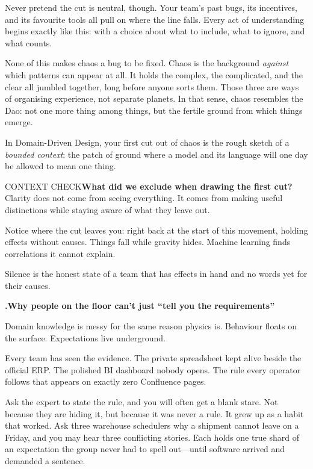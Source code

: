 \documentclass[10pt,a4paper]{article}
\newcounter{movement}
\newcounter{sub}[movement]
\renewcommand{\thesub}{\arabic{movement}.\arabic{sub}}
\newcommand{\Checkpoint}[2]{\begin{checkbox}{#1}#2\end{checkbox}}
\newcommand{\SubHead}[1]{%
  \par\Needspace{5\baselineskip}\stepcounter{sub}\vspace{2mm}%
  {\ttfamily\bfseries\footnotesize\textcolor{G2}{\thesub}\enspace\sffamily\bfseries\normalsize #1\par}%
  \vspace{0.6mm}%
}
\begin{document}
Never pretend the cut is neutral, though. Your team's past bugs, its incentives, and its favourite tools all pull on where the line falls. Every act of understanding begins exactly like this: with a choice about what to include, what to ignore, and what counts.

None of this makes chaos a bug to be fixed. Chaos is the background \emph{against} which patterns can appear at all. It holds the complex, the complicated, and the clear all jumbled together, long before anyone sorts them. Those three are ways of organising experience, not separate planets. In that sense, chaos resembles the Dao: not one more thing among things, but the fertile ground from which things emerge.

In Domain-Driven Design, your first cut out of chaos is the rough sketch of a \emph{bounded context}: the patch of ground where a model and its language will one day be allowed to mean one thing.

\Checkpoint{CONTEXT CHECK}{\textbf{What did we exclude when drawing the first cut?} Clarity does not come from seeing everything. It comes from making useful distinctions while staying aware of what they leave out.}

Notice where the cut leaves you: right back at the start of this movement, holding effects without causes. Things fall while gravity hides. Machine learning finds correlations it cannot explain.

Silence is the honest state of a team that has effects in hand and no words yet for their causes.

\SubHead{Why people on the floor can't just “tell you the requirements”}

Domain knowledge is messy for the same reason physics is. Behaviour floats on the surface. Expectations live underground.

Every team has seen the evidence. The private spreadsheet kept alive beside the official ERP. The polished BI dashboard nobody opens. The rule every operator follows that appears on exactly zero Confluence pages.

Ask the expert to state the rule, and you will often get a blank stare. Not because they are hiding it, but because it was never a rule. It grew up as a habit that worked. Ask three warehouse schedulers why a shipment cannot leave on a Friday, and you may hear three conflicting stories. Each holds one true shard of an expectation the group never had to spell out—until software arrived and demanded a sentence.
\end{document}
